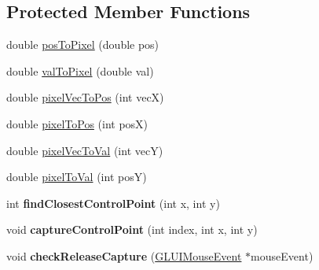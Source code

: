 \subsection*{Protected Member Functions}
\begin{DoxyCompactItemize}
\item 
double \hyperlink{classCartWheel_1_1GL_1_1GLUICurveEditor_a2fabff94d008f4d4575c487c43827526}{posToPixel} (double pos)
\item 
double \hyperlink{classCartWheel_1_1GL_1_1GLUICurveEditor_a82491a5d07af8e75298bd6118739b1d8}{valToPixel} (double val)
\item 
double \hyperlink{classCartWheel_1_1GL_1_1GLUICurveEditor_a4c31fd99c4d4d053a86092fe589dd5e3}{pixelVecToPos} (int vecX)
\item 
double \hyperlink{classCartWheel_1_1GL_1_1GLUICurveEditor_a39b716a822a250d5d1376e0df9ef4066}{pixelToPos} (int posX)
\item 
double \hyperlink{classCartWheel_1_1GL_1_1GLUICurveEditor_a4e5c754e370061ac7a2fba6f4964c15b}{pixelVecToVal} (int vecY)
\item 
double \hyperlink{classCartWheel_1_1GL_1_1GLUICurveEditor_acfac3c216bba8b5d5a144a8c0e22ebf0}{pixelToVal} (int posY)
\item 
\hypertarget{classCartWheel_1_1GL_1_1GLUICurveEditor_a239aa110bc6869820added65925c77db}{
int {\bfseries findClosestControlPoint} (int x, int y)}
\label{classCartWheel_1_1GL_1_1GLUICurveEditor_a239aa110bc6869820added65925c77db}

\item 
\hypertarget{classCartWheel_1_1GL_1_1GLUICurveEditor_af4897351ac0a6a53a6be181bb7e524e1}{
void {\bfseries captureControlPoint} (int index, int x, int y)}
\label{classCartWheel_1_1GL_1_1GLUICurveEditor_af4897351ac0a6a53a6be181bb7e524e1}

\item 
\hypertarget{classCartWheel_1_1GL_1_1GLUICurveEditor_a06f5457030a618e32ee829bab2b8e295}{
void {\bfseries checkReleaseCapture} (\hyperlink{classCartWheel_1_1GL_1_1GLUIMouseEvent}{GLUIMouseEvent} $\ast$mouseEvent)}
\label{classCartWheel_1_1GL_1_1GLUICurveEditor_a06f5457030a618e32ee829bab2b8e295}

\end{DoxyCompactItemize}
